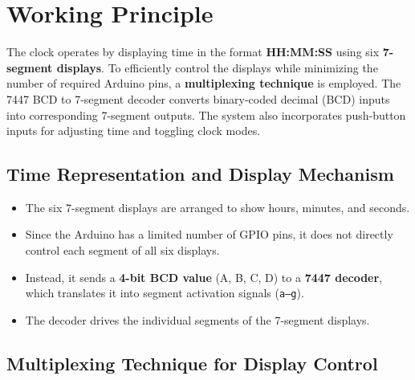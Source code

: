\documentclass[journal]{IEEEtran}
\begin{document}
\section{Working Principle}

The clock operates by displaying time in the format \textbf{HH:MM:SS} using six \textbf{7-segment displays}. To efficiently control the displays while minimizing the number of required Arduino pins, a \textbf{multiplexing technique} is employed. The 7447 BCD to 7-segment decoder converts binary-coded decimal (BCD) inputs into corresponding 7-segment outputs. The system also incorporates push-button inputs for adjusting time and toggling clock modes.

\subsection{Time Representation and Display Mechanism}

\begin{itemize}
    \item The six 7-segment displays are arranged to show hours, minutes, and seconds.
    \item Since the Arduino has a limited number of GPIO pins, it does not directly control each segment of all six displays.
    \item Instead, it sends a \textbf{4-bit BCD value} (A, B, C, D) to a \textbf{7447 decoder}, which translates it into segment activation signals (\texttt{a--g}).
    \item The decoder drives the individual segments of the 7-segment displays.
\end{itemize}

\subsection{Multiplexing Technique for Display Control}
\end{document}

